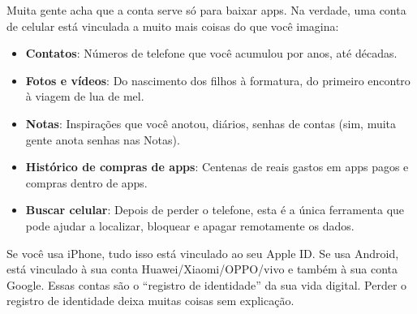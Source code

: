 


Muita gente acha que a conta serve só para baixar apps. Na verdade, uma conta de celular está vinculada a muito mais coisas do que você imagina:

\begin{itemize}
  \item \textbf{Contatos}: Números de telefone que você acumulou por anos, até décadas.
  \item \textbf{Fotos e vídeos}: Do nascimento dos filhos à formatura, do primeiro encontro à viagem de lua de mel.
  \item \textbf{Notas}: Inspirações que você anotou, diários, senhas de contas (sim, muita gente anota senhas nas Notas).
  \item \textbf{Histórico de compras de apps}: Centenas de reais gastos em apps pagos e compras dentro de apps.
  \item \textbf{Buscar celular}: Depois de perder o telefone, esta é a única ferramenta que pode ajudar a localizar, bloquear e apagar remotamente os dados.
\end{itemize}

Se você usa iPhone, tudo isso está vinculado ao seu Apple ID. Se usa Android, está vinculado à sua conta Huawei/Xiaomi/OPPO/vivo e também à sua conta Google. Essas contas são o “registro de identidade” da sua vida digital. Perder o registro de identidade deixa muitas coisas sem explicação.


